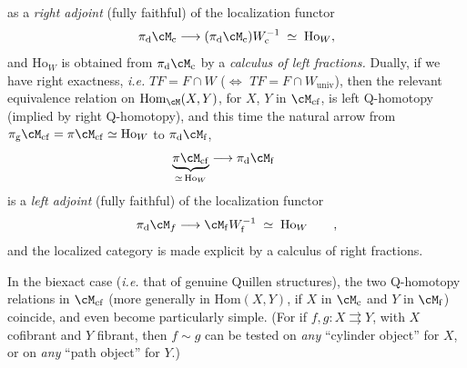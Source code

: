 \setcounter{footnote}{23}

as a \textit{right adjoint} (fully faithful) of the localization functor
\[
\pi_{\mathrm{d}}\cM_{\mathrm{c}} \longrightarrow (\pi_{\mathrm{d}}\cM_{\mathrm{c}})W_{\mathrm{c}}^{-1} \;\simeq\; \mathrm{Ho}_W,
\]
and $\mathrm{Ho}_W$ is obtained from $\pi_{\mathrm{d}}\cM_{\mathrm{c}}$ by a \textit{calculus of left fractions.} Dually, if we have right exactness, \textit{i.e.} $TF = F\cap W$ ($\Longleftrightarrow$ $TF = F\cap W_{\mathrm{univ}}$), then the relevant equivalence relation on $\mathrm{Hom}_{\cM}(X,Y)$, for $X$, $Y$ in $\cM_{\mathrm{cf}}$, is left Q-homotopy (implied by right Q-homotopy), and this time the natural arrow from $\pi_{\mathrm{g}}\cM_{\mathrm{cf}} = \pi\cM_{\mathrm{cf}} \simeq \mathrm{Ho}_W$ to $\pi_{\mathrm{d}}\cM_{\mathrm{f}}$,
\[
\underbrace{\pi\cM_{\mathrm{cf}}}_{\simeq\,\mathrm{Ho}_W} \longrightarrow \pi_{\mathrm{d}}\cM_{\mathrm{f}} \qquad 
\]
is a \textit{left adjoint} (fully faithful) of the localization functor
\[
\pi_{\mathrm{d}}\cM_f \longrightarrow \cM_{\mathrm{f}}W_{\mathrm{f}}^{-1} \;\simeq\; \mathrm{Ho}_W \qquad, %
\]
and the localized category is made explicit by a calculus of right fractions.

In the biexact case (\textit{i.e.} that of genuine Quillen structures), the two Q-homotopy relations in $\cM_{\mathrm{cf}}$ (more generally in $\mathrm{Hom}(X,Y)$, if $X$ in $\cM_{\mathrm{c}}$ and $Y$ in $\cM_{\mathrm{f}}$)
coincide, and even become particularly simple. (For if $f, g : X \rightrightarrows Y$, with $X$ cofibrant and $Y$ fibrant, then $f\sim g$ can be tested on \textit{any} ``cylinder object'' for $X$, or on \textit{any} ``path object'' for $Y$.)

